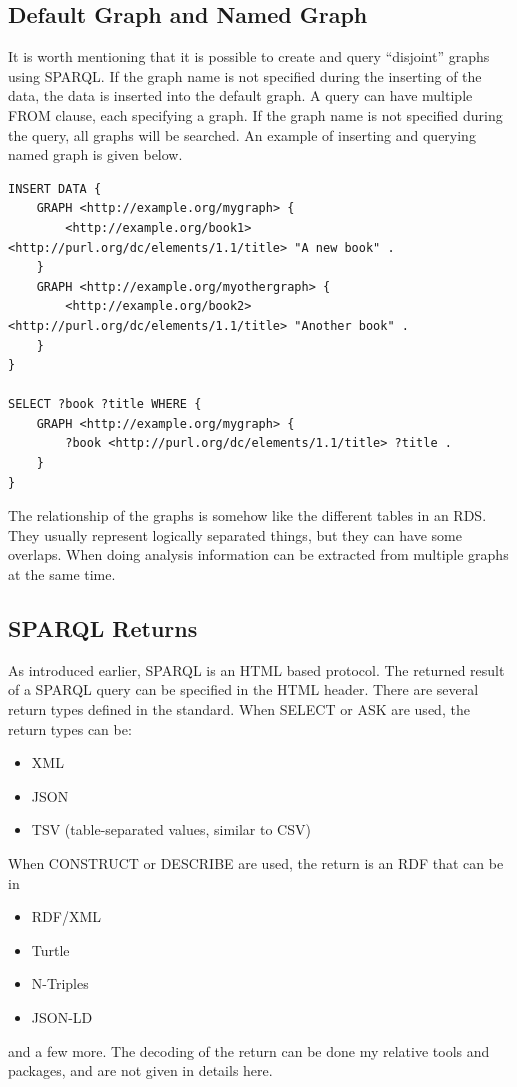 \subsection{Default Graph and Named Graph}

It is worth mentioning that it is possible to create and query ``disjoint'' graphs using SPARQL. If the graph name is not specified during the inserting of the data, the data is inserted into the default graph. A query can have multiple FROM clause, each specifying a graph. If the graph name is not specified during the query, all graphs will be searched. An example of inserting and querying named graph is given below.

\begin{lstlisting}
INSERT DATA {
	GRAPH <http://example.org/mygraph> {
		<http://example.org/book1> <http://purl.org/dc/elements/1.1/title> "A new book" .
	}
	GRAPH <http://example.org/myothergraph> {
		<http://example.org/book2> <http://purl.org/dc/elements/1.1/title> "Another book" .
	}
}

SELECT ?book ?title WHERE {
	GRAPH <http://example.org/mygraph> {
		?book <http://purl.org/dc/elements/1.1/title> ?title .
	}
}
\end{lstlisting}

The relationship of the graphs is somehow like the different tables in an RDS. They usually represent logically separated things, but they can have some overlaps. When doing analysis information can be extracted from multiple graphs at the same time.

\subsection{SPARQL Returns}

As introduced earlier, SPARQL is an HTML based protocol. The returned result of a SPARQL query can be specified in the HTML header. There are several return types defined in the standard. When SELECT or ASK are used, the return types can be:
\begin{itemize}
	\item XML
	\item JSON
	\item TSV (table-separated values, similar to CSV)
\end{itemize}
When CONSTRUCT or DESCRIBE are used, the return is an RDF that can be in
\begin{itemize}
	\item RDF/XML
	\item Turtle
	\item N-Triples
	\item JSON-LD
\end{itemize}
and a few more. The decoding of the return can be done my relative tools and packages, and are not given in details here.

